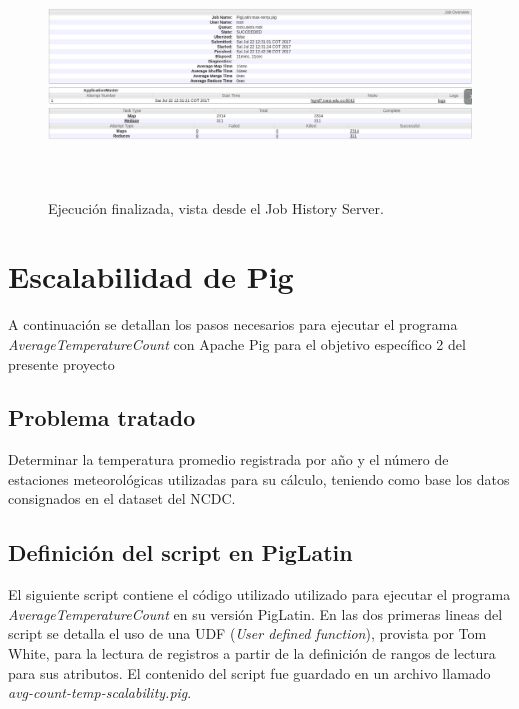 \begin{figure}[H]
  \centering
      \includegraphics[width=\textwidth, height=2.5in]{fig/04/05}
  \caption{Ejecución finalizada, vista desde el Job History Server.}
\end{figure}

\section{Escalabilidad de Pig}

A continuación se detallan los pasos necesarios para ejecutar el programa \textit{AverageTemperatureCount} con Apache Pig para el objetivo específico 2 del presente proyecto \\

\subsection{Problema tratado}

Determinar la temperatura promedio registrada por año y el número de estaciones meteorológicas utilizadas para su cálculo, teniendo como base los datos consignados en el dataset del NCDC.

\subsection{Definición del script en PigLatin}

El siguiente script contiene el código utilizado utilizado para ejecutar el programa \textit{AverageTemperatureCount} en su versión PigLatin. En las dos primeras lineas del script se detalla el uso de una UDF (\textit{User defined function}), provista por Tom White, para la lectura de registros a partir de la definición de rangos de lectura para sus atributos. El contenido del script fue guardado en un archivo llamado \textit{avg-count-temp-scalability.pig}.

